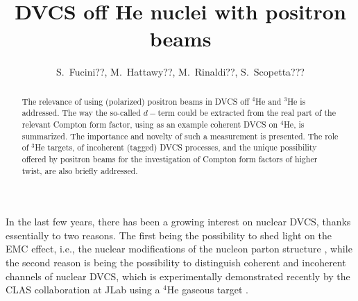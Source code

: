 \documentclass[times, twoside]{PosWhiPap}
\begin{document}
\title{DVCS off He nuclei with positron beams}

\author[]
{S.~Fucini??, M.~Hattawy??, M.~Rinaldi??, S.~Scopetta???  }


\maketitle

\begin{abstract}
The relevance of using (polarized) positron beams in DVCS off $^4$He and $^3$He 
   is addressed. The way the so-called $d-$term could be extracted from the 
   real part of the relevant Compton form factor, using as an example coherent 
   DVCS on $^4$He, is summarized. The importance and novelty of such a 
   measurement is presented. The role of $^3$He targets, of incoherent (tagged) 
   DVCS processes, and the unique possibility offered by positron beams for the 
   investigation of Compton form factors of higher twist, are also  briefly 
   addressed.
\end {abstract}




In the last few years, there has been a growing interest on nuclear DVCS, 
   thanks essentially to two reasons. The first being the possibility to shed 
   light on the EMC effect, i.e., the nuclear modifications of the nucleon 
   parton structure \cite{Dupre:2015jha, Cloet:2019mql}, while the second 
   reason is being the possibility to distinguish coherent and incoherent 
   channels of nuclear DVCS, which is experimentally demonstrated recently by 
   the CLAS collaboration at JLab using a $^4$He gaseous target 
   \cite{Hattawy:2017woc, Hattawy:2018liu}.
\end{document}
